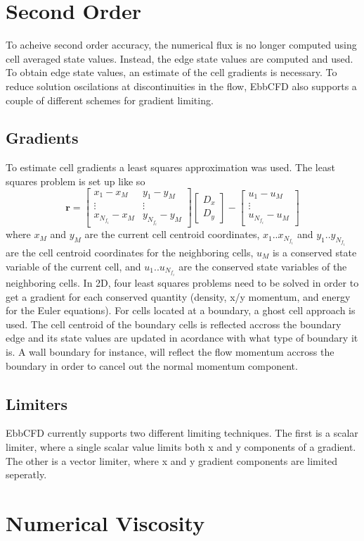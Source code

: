 \documentclass[12pt,parskip=full]{article}
\numberwithin{subsection}{section}
\begin{document}
	\section{Second Order}
		To acheive second order accuracy, the numerical flux is no longer computed using cell averaged state values.
		Instead, the edge state values are computed and used. To obtain edge state values, an estimate of the cell gradients 
		is necessary. To reduce solution oscilations at discontinuities in the flow, EbbCFD also supports a couple of
		different schemes for gradient limiting.

		\subsection{Gradients}
			To estimate cell gradients a least squares approximation was used. The least squares problem is set up like so
			\begin{equation}
				\mathbf{r} = \begin{bmatrix} x_1 - x_M & y_1 - y_M \\ \vdots & \vdots \\ x_{N_{f_i}} - x_M & y_{N_{f_i}} - y_M \end{bmatrix} \begin{bmatrix}D_x \\ D_y \end{bmatrix} - \begin{bmatrix} u_1 - u_M \\ \vdots \\ u_{N_{f_i}} - u_M \end{bmatrix}
			\end{equation}
			where $x_M$ and $y_M$ are the current cell centroid coordinates, $x_1..x_{N_{f_i}}$ and $y_1..y_{N_{f_i}}$ 
			are the cell centroid coordinates for the neighboring cells, $u_M$ is a conserved state variable of the current 
			cell, and $u_1..u_{N_{f_i}}$ are the conserved state variables of the neighboring cells. In 2D, four
			least squares problems need to be solved in order to get a gradient for each conserved quantity (density,
			x/y momentum, and energy for the Euler equations). For cells located at a boundary, a ghost cell approach is
			used. The cell centroid of the boundary cells is reflected accross the boundary edge and its state values
			are updated in acordance with what type of boundary it is. A wall boundary for instance, will reflect the
			flow momentum accross the boundary in order to cancel out the normal momentum component.

		\subsection{Limiters}
			EbbCFD currently supports two different limiting techniques. The first is a scalar limiter, where a single scalar
			value limits both x and y components of a gradient. The other is a vector limiter, where x and y gradient components
			are limited seperatly. 
			
	\section{Numerical Viscosity}
\end{document}
